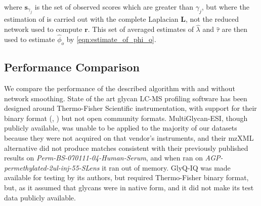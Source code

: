         \noindent where $\mathbf{s}_{\gamma_j}$ is the set of observed
        scores which are greater than $\gamma_j$, but where the estimation
        of is carried out with the complete Laplacian $\mathbf{L}$,
        not the reduced network used to compute $\mathbf{r}$. This set of
        averaged estimates of ${\hat \lambda}$ and ${\hat \tau}$ are then
        used to estimate ${\hat \phi_o}$ by \eqref{eqn:estimate_of_phi_o}.

\subsection{Performance Comparison}
    We compare the performance of the described algorithm with and without
    network smoothing. State of the art glycan LC-MS profiling software
    has been designed around Thermo-Fisher Scientific instrumentation, with
    support for their binary format (\cite{Kronewitter2014}, \cite{Yu2013})
    but not open community formats. MultiGlycan-ESI, though publicly available,
    was unable to be applied to the majority of our datasets because they were
    not acquired on that vendor's instruments, and their mzXML alternative
    did not produce matches consistent with their previously published results
    on \textit{Perm-BS-070111-04-Human-Serum}, and when ran on
    \textit{AGP-permethylated-2ul-inj-55-SLens} it ran out of memory. GlyQ-IQ
    was made available for testing by its authors, but required Thermo-Fisher
    binary format, but, as it assumed that glycans were in native form, and it
    did not make its test data publicly available.
